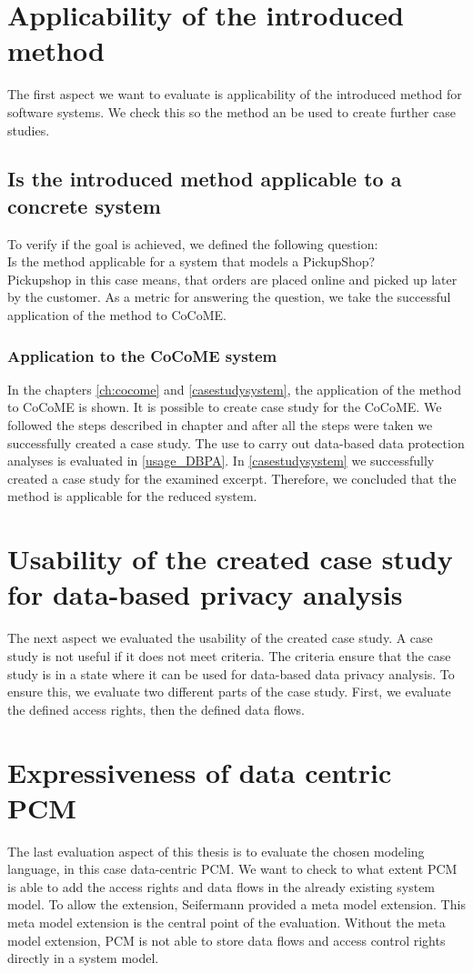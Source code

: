 \section{Applicability of the introduced method}
The first aspect we want to evaluate is applicability of the introduced method for software systems. We check this so the method an be used to create further case studies. 
\subsection{Is the introduced method applicable to a concrete system}
To verify if the goal is achieved, we defined the following question:\\
Is the method applicable for a system that models a PickupShop?\\
Pickupshop in this case means, that orders are placed online and picked up later by the customer.
As a metric for answering the question, we take the successful application of the method to CoCoME. 
\subsubsection{Application to the CoCoME system}
In the chapters \autoref{ch:cocome} and \autoref{casestudysystem}, the application of the method to CoCoME is shown. It is possible to create case study for the CoCoME. We followed the steps described in chapter  and after all the steps were taken we successfully created a case study. The use to carry out data-based data protection analyses is evaluated in  \autoref{usage_DBPA}. In \autoref{casestudysystem} we successfully created a case study for the examined excerpt. Therefore, we concluded that the method is applicable for the reduced system.
\section{Usability of the created case study for data-based privacy analysis}
\label{usage_DBPA}
The next aspect we evaluated the usability of the created case study. A case study is not useful if it does not meet criteria. The criteria ensure that the case study is in a state where it can be used for data-based data privacy analysis. To ensure this, we evaluate two different parts of the case study. First, we evaluate the defined access rights, then the defined data flows. 


\section{Expressiveness of data centric PCM}
The last evaluation aspect of this thesis is to evaluate the chosen modeling language, in this case data-centric PCM. We want to check to what extent PCM is able to add the access rights and data flows in the already existing system model. To allow the extension, Seifermann \cite{MMextension} provided a meta model extension. This meta model extension is the central point of the evaluation. Without the meta model extension, PCM is not able to store data flows and access control rights directly in a system model. 
